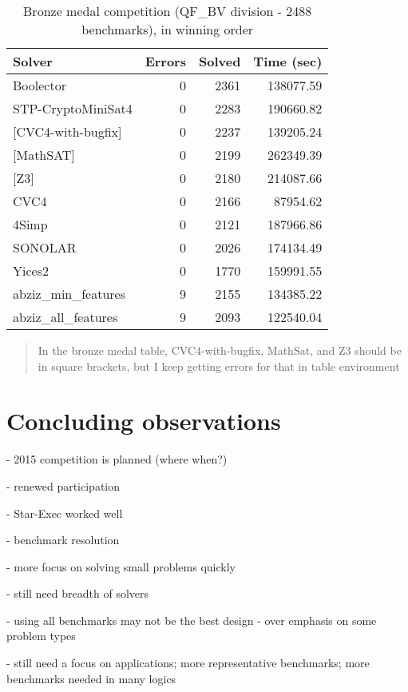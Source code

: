 \documentclass[twosize,11pt]{article}
\newcommand{\comment}[2]{\begin{quote}\sc #1\marginpar{\textcolor{red}{$\ast^{\mbox{#2}}$}}\end{quote}}
\newcommand{\davidc}[1]{\comment{#1}{DC}}
\begin{document}
\begin{table}
\centering
\begin{tabular}{|l|rrr|}
\hline
 Solver & Errors & Solved & Time (sec)\\
\hline
Boolector &	0  &		2361  &		138077.59 \\
STP-CryptoMiniSat4 & 0  &		2283  &		190660.82 	\\
{[}CVC4-with-bugfix] &	0  &		2237 	 &		139205.24 \\
{[}MathSAT]  &	0  &		2199 	 &		262349.39 \\
{[}Z3]  & 	0  &		2180 	 &		214087.66 	\\
CVC4  &	0  &		2166 	 &		87954.62 	\\
4Simp &	0 &	2121 	 &		187966.86 \\
SONOLAR &	0  &		2026  &	 	174134.49 \\
Yices2 &	0  &		1770  &	 	159991.55 \\
abziz\_min\_features &	9  &		2155 	 &	 	134385.22 \\
abziz\_all\_features &	9  &		2093 	 &	 	122540.04 \\
\hline
\end{tabular}
\vspace{.2in}
\caption{Bronze medal competition (QF\_BV division - 2488 benchmarks), in winning order}
\label{Table:bronze}
\end{table}

\davidc{In the bronze medal table, CVC4-with-bugfix, MathSat, and Z3 should  be in square brackets, but I keep getting errors for that in table environment}


\section{Concluding observations}
\label{sec:conclusion}

- 2015 competition is planned (where when?)

- renewed participation

- Star-Exec worked well

- benchmark resolution

- more focus on solving small problems quickly

- still need breadth of solvers

- using all benchmarks may not be the best design - over emphasis on some problem types

- still need a focus on applications; more representative benchmarks; more benchmarks needed in many logics
\end{document}
